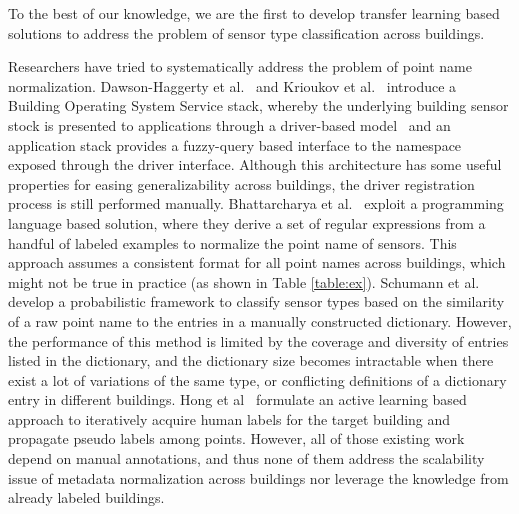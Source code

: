 To the best of our knowledge, we are the first to develop transfer learning based solutions to address the problem of sensor type classification across buildings.

Researchers have tried to systematically address the problem of point name normalization.
Dawson-Haggerty et al.~\cite{boss} and Krioukov et al.~\cite{bas}
introduce a Building Operating System Service stack, whereby
the underlying building sensor stock is presented to applications through a driver-based model \
and an application stack provides a fuzzy-query based interface to the namespace exposed
through the driver interface.
Although this architecture has some useful properties for easing generalizability across
buildings, the driver registration process is still performed manually. Bhattarcharya et al.~\cite{arka} exploit a programming language based solution,
where they derive a set of regular expressions from a handful of labeled examples
to normalize the point name of sensors.
This approach assumes a consistent format for all point names across buildings, which might not be true in practice (as shown in Table \ref{table:ex}).
Schumann et al.~\cite{ibm} develop a probabilistic framework to classify sensor types
based on the similarity of a raw point name to the entries in a manually constructed dictionary.
However, the performance of this method is limited by the coverage and diversity of entries listed in the dictionary, and the dictionary size becomes intractable when there exist a lot of variations of the same type, or conflicting definitions of a dictionary entry in different buildings.
Hong et al~\cite{cikm} formulate an active learning based approach to iteratively
acquire human labels for the target building and propagate pseudo labels among points.
However, all of those existing work depend on manual annotations, and thus none of them address the scalability issue of metadata
normalization across buildings nor leverage the knowledge from already labeled buildings.

